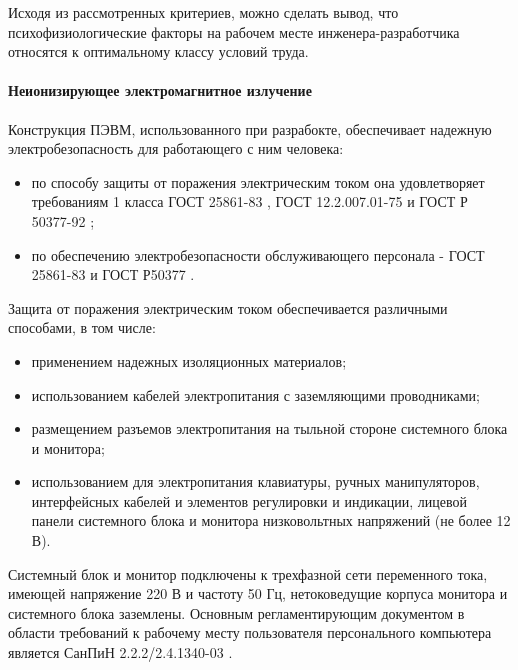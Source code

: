 Исходя из рассмотренных критериев, можно сделать вывод, что психофизиологические
факторы на рабочем месте инженера-разработчика относятся к оптимальному классу
условий труда.

\paragraph{Неионизирующее электромагнитное излучение}

Конструкция ПЭВМ, использованного при разрабокте, обеспечивает надежную
электробезопасность для работающего с ним человека:

\begin{itemize}
    \item   по способу защиты от поражения электрическим током она удовлетворяет требованиям
            1 класса ГОСТ 25861-83 \cite{ecology_gost_25861_83}, ГОСТ 12.2.007.01-75
            \cite{ecology_gost_12_2_007_01_75} и ГОСТ Р 50377-92 \cite{ecology_gost_50377_92};

    \item   по обеспечению электробезопасности обслуживающего персонала - ГОСТ 25861-83
            \cite{ecology_gost_25861_83} и ГОСТ Р50377 \cite{ecology_gost_50377_92}.
\end{itemize}

Защита от поражения электрическим током обеспечивается различными способами,
в том числе:

\begin{itemize}
    \item   применением надежных изоляционных материалов;
    \item   использованием кабелей электропитания с заземляющими проводниками;
    \item   размещением разъемов электропитания на тыльной стороне системного блока
            и монитора;
    \item   использованием для электропитания клавиатуры, ручных манипуляторов,
            интерфейсных кабелей и элементов регулировки и индикации, лицевой панели системного блока и монитора низковольтных напряжений (не более 12 В).
\end{itemize}

Системный блок и монитор подключены к трехфазной сети переменного тока, имеющей
напряжение 220 В и частоту 50 Гц, нетоковедущие корпуса монитора и системного блока
заземлены. Основным регламентирующим документом в области требований к рабочему
месту пользователя персонального компьютера является СанПиН 2.2.2/2.4.1340-03
\cite{ecology_sanpin_1340_03}.

